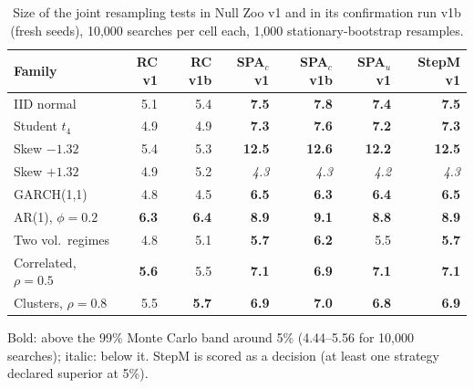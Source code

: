 \begin{table}[t]
\centering
\small
\caption{Size of the joint resampling tests in Null Zoo v1 and in its confirmation run v1b (fresh seeds), 10,000 searches per cell each, 1,000 stationary-bootstrap resamples.}
\label{tab:size-joint}
\begin{tabular}{lrrrrrr}
\toprule
Family & RC v1 & RC v1b & SPA$_c$ v1 & SPA$_c$ v1b & SPA$_u$ v1 & StepM v1 \\
\midrule
IID normal & 5.1 & 5.4 & \textbf{7.5} & \textbf{7.8} & \textbf{7.4} & \textbf{7.5} \\
Student $t_4$ & 4.9 & 4.9 & \textbf{7.3} & \textbf{7.6} & \textbf{7.2} & \textbf{7.3} \\
Skew $-1.32$ & 5.4 & 5.3 & \textbf{12.5} & \textbf{12.6} & \textbf{12.2} & \textbf{12.5} \\
Skew $+1.32$ & 4.9 & 5.2 & \textit{4.3} & \textit{4.3} & \textit{4.2} & \textit{4.3} \\
GARCH(1,1) & 4.8 & 4.5 & \textbf{6.5} & \textbf{6.3} & \textbf{6.4} & \textbf{6.5} \\
AR(1), $\phi=0.2$ & \textbf{6.3} & \textbf{6.4} & \textbf{8.9} & \textbf{9.1} & \textbf{8.8} & \textbf{8.9} \\
Two vol.\ regimes & 4.8 & 5.1 & \textbf{5.7} & \textbf{6.2} & 5.5 & \textbf{5.7} \\
Correlated, $\rho=0.5$ & \textbf{5.6} & 5.5 & \textbf{7.1} & \textbf{6.9} & \textbf{7.1} & \textbf{7.1} \\
Clusters, $\rho=0.8$ & 5.5 & \textbf{5.7} & \textbf{6.9} & \textbf{7.0} & \textbf{6.8} & \textbf{6.9} \\
\bottomrule
\end{tabular}
\par\smallskip\begin{minipage}{0.97\linewidth}\footnotesize Bold: above the 99\% Monte Carlo band around 5\% (4.44--5.56 for 10,000 searches); italic: below it. StepM is scored as a decision (at least one strategy declared superior at 5\%).\end{minipage}
\end{table}


